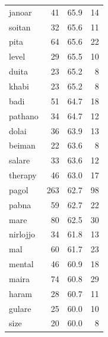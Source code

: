\begin{tabular}{lrrr}
janoar & 41 & 65.9 & 14 \\
soitan & 32 & 65.6 & 11 \\
pita & 64 & 65.6 & 22 \\
level & 29 & 65.5 & 10 \\
duita & 23 & 65.2 & 8 \\
khabi & 23 & 65.2 & 8 \\
badi & 51 & 64.7 & 18 \\
pathano & 34 & 64.7 & 12 \\
dolai & 36 & 63.9 & 13 \\
beiman & 22 & 63.6 & 8 \\
salare & 33 & 63.6 & 12 \\
therapy & 46 & 63.0 & 17 \\
pagol & 263 & 62.7 & 98 \\
pabna & 59 & 62.7 & 22 \\
mare & 80 & 62.5 & 30 \\
nirlojjo & 34 & 61.8 & 13 \\
mal & 60 & 61.7 & 23 \\
mental & 46 & 60.9 & 18 \\
maira & 74 & 60.8 & 29 \\
haram & 28 & 60.7 & 11 \\
gulare & 25 & 60.0 & 10 \\
size & 20 & 60.0 & 8 \\
\bottomrule
\end{tabular}
